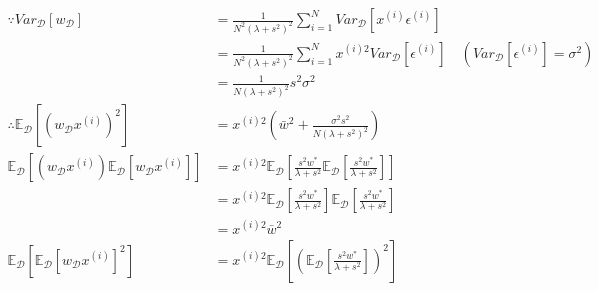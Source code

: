 \documentclass{article}
\theoremstyle{definition}
\theoremstyle{remark}
\begin{document}
\begin{enumerate}[font={\Large\bfseries},left=0pt]
\begin{enumerate}
		      \begin{align}
			      \because Var_\mathcal{D}[w_\mathcal{D}]                                                                          & = \frac{1}{N^2(\lambda + s^2)^2} \sum^{N}_{i = 1}Var_\mathcal{D} \left[x^{(i)}\epsilon^{(i)}\right]                                                                  \\[2pt]
			                                                                                                                       & = \frac{1}{N^2(\lambda + s^2)^2} \sum^{N}_{i = 1}x^{(i)2}Var_\mathcal{D} \left[\epsilon^{(i)}\right]  \quad (Var_\mathcal{D} \left[\epsilon^{(i)}\right] = \sigma^2) \\[2pt]
			                                                                                                                       & = \frac{1}{N(\lambda + s^2)^2} s^2 \sigma^2                                                                                                                          \\[4pt]
			      \therefore \mathbb{E}_{\mathcal{D}} \left[(w_{\mathcal{D}}x^{(i)})^2 \right]                                     & = x^{(i)2}\left(\bar{w}^2 + \frac{\sigma^2 s^2}{N(\lambda + s^2)^2} \right)                                                                                          \\[2pt]
			      \mathbb{E}_{\mathcal{D}} \left[(w_{\mathcal{D}}x^{(i)})\mathbb{E}_{\mathcal{D}}[w_{\mathcal{D}} x^{(i)}] \right] & = x^{(i)2}\mathbb{E}_{\mathcal{D}} \left[ \frac{s^2w^*}{\lambda + s^2} \mathbb{E}_{\mathcal{D}} \left[\frac{s^2w^*}{\lambda + s^2}\right]\right]                     \\[2pt]
			                                                                                                                       & = x^{(i)2}\mathbb{E}_{\mathcal{D}} \left[\frac{s^2w^*}{\lambda + s^2}\right]\mathbb{E}_{\mathcal{D}} \left[\frac{s^2w^*}{\lambda + s^2}\right]                       \\[2pt]
			                                                                                                                       & = x^{(i)2} \bar{w}^2                                                                                                                                                 \\[2pt]
			      \mathbb{E}_{\mathcal{D}}\left[ \mathbb{E}_{\mathcal{D}}[w_{\mathcal{D}} x^{(i)}]^2\right]                        & = x^{(i)2}\mathbb{E}_{\mathcal{D}} \left[\left(\mathbb{E}_{\mathcal{D}} \left[\frac{s^2w^*}{\lambda + s^2}\right] \right)^2\right]                                   \\[2pt]

\end{align}
\end{enumerate}
\end{enumerate}
\end{document}
